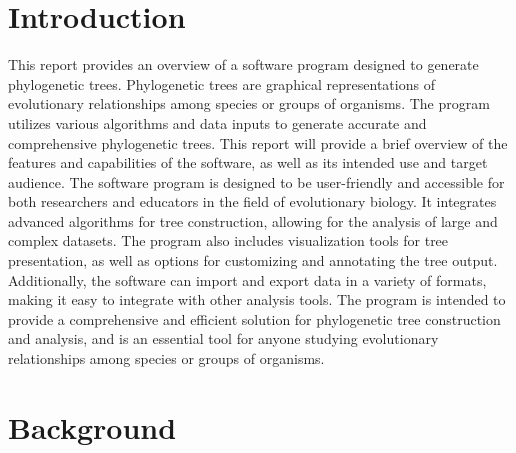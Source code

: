 \documentclass[12pt]{article}
\begin{document}

\newpage
{}

\tableofcontents

\newpage
{}

\section{Introduction}\label{sec:introducao} %
This report provides an overview of a software program designed to generate phylogenetic trees. Phylogenetic trees are graphical representations of evolutionary relationships among species or groups of organisms. The program utilizes various algorithms and data inputs to generate accurate and comprehensive phylogenetic trees. This report will provide a brief overview of the features and capabilities of the software, as well as its intended use and target audience. The software program is designed to be user-friendly and accessible for both researchers and educators in the field of evolutionary biology. It integrates advanced algorithms for tree construction, allowing for the analysis of large and complex datasets. The program also includes visualization tools for tree presentation, as well as options for customizing and annotating the tree output. Additionally, the software can import and export data in a variety of formats, making it easy to integrate with other analysis tools. The program is intended to provide a comprehensive and efficient solution for phylogenetic tree construction and analysis, and is an essential tool for anyone studying evolutionary relationships among species or groups of organisms.

\section{Background}\label{sec:desenvolvimentos}
\end{document}
